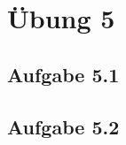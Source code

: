 \documentclass{standalone}
\begin{document}
    
\section{Übung 5}

\subsection{Aufgabe 5.1}


\subsection{Aufgabe 5.2}
\end{document}
